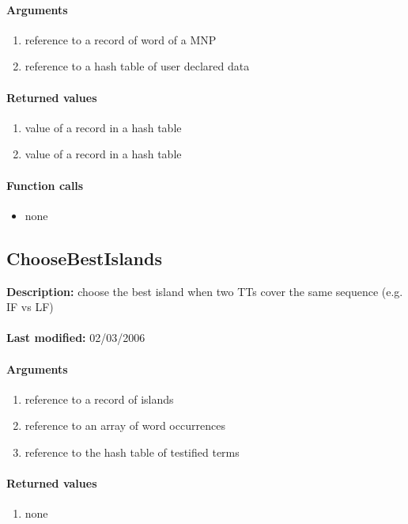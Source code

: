 \paragraph{Arguments}
\begin{enumerate}
\item reference to a record of word of a MNP
\item reference to a hash table of user declared data
\end{enumerate}

\paragraph{Returned values}
\begin{enumerate}
\item value of a record in a hash table
\item value of a record in a hash table
\end{enumerate}

\paragraph{Function calls}
\begin{itemize}
\item none
\end{itemize}

\subsection{ChooseBestIslands}
\textbf{Description:} choose the best island when two TTs cover the same sequence (e.g. IF vs LF)\\
\\\textbf{Last modified:} 02/03/2006

\paragraph{Arguments}
\begin{enumerate}
\item reference to a record of islands
\item reference to an array of word occurrences
\item reference to the hash table of testified terms
\end{enumerate}

\paragraph{Returned values}
\begin{enumerate}
\item none
\end{enumerate}

